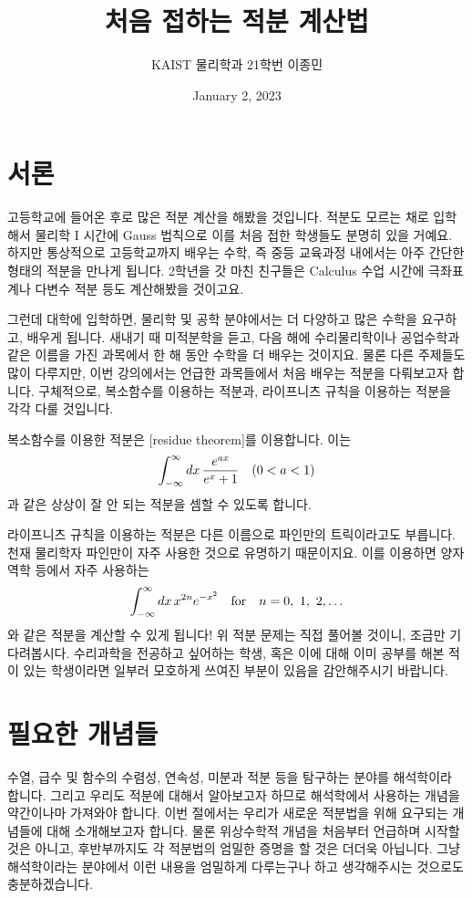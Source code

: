 \documentclass[11pt]{book}
\title{처음 접하는 적분 계산법}
\author{KAIST 물리학과 21학번 이종민}
\date{January 2, 2023}
\begin{document}
\section*{서론}
\begin{MLPar}
고등학교에 들어온 후로 많은 적분 계산을 해봤을 것입니다.
적분도 모르는 채로 입학해서 물리학 I 시간에 Gauss 법칙으로 이를 처음 접한 학생들도 분명히 있을 거예요.
하지만 통상적으로 고등학교까지 배우는 수학, 즉 중등 교육과정 내에서는 아주 간단한 형태의 적분을 만나게 됩니다.
2학년을 갓 마친 친구들은 Calculus 수업 시간에 극좌표계나 다변수 적분 등도 계산해봤을 것이고요.

그런데 대학에 입학하면, 물리학 및 공학 분야에서는 더 다양하고 많은 수학을 요구하고, 배우게 됩니다.
새내기 때 미적분학을 듣고, 다음 해에 수리물리학이나 공업수학과 같은 이름을 가진 과목에서 한 해 동안 수학을 더 배우는 것이지요.
물론 다른 주제들도 많이 다루지만, 이번 강의에서는 언급한 과목들에서 처음 배우는 적분을 다뤄보고자 합니다.
구체적으로, 복소함수를 이용하는 적분과, 라이프니츠 규칙을 이용하는 적분을 각각 다룰 것입니다.

복소함수를 이용한 적분은 [residue theorem]를 이용합니다.
이는
\[\int_{-\infty}^{\infty}\dd{x} \frac{e^{ax}}{e^x + 1} \quad(0 < a < 1)\]
과 같은 상상이 잘 안 되는 적분을 셈할 수 있도록 합니다.

라이프니츠 규칙을 이용하는 적분은 다른 이름으로 파인만의 트릭이라고도 부릅니다.
천재 물리학자 파인만이 자주 사용한 것으로 유명하기 때문이지요.
이를 이용하면 양자역학 등에서 자주 사용하는
\[\int_{-\infty}^{\infty}\dd{x} x^{2n} e^{-x^2} \quad\text{for}\quad n=0,\ 1,\ 2, \ldots\]
와 같은 적분을 계산할 수 있게 됩니다!
위 적분 문제는 직접 풀어볼 것이니, 조금만 기다려봅시다.
수리과학을 전공하고 싶어하는 학생, 혹은 이에 대해 이미 공부를 해본 적이 있는 학생이라면 일부러 모호하게 쓰여진 부분이 있음을 감안해주시기 바랍니다.
\end{MLPar}



\section{필요한 개념들}
\begin{MLPar}
수열, 급수 및 함수의 수렴성, 연속성, 미분과 적분 등을 탐구하는 분야를 해석학이라 합니다.
그리고 우리도 적분에 대해서 알아보고자 하므로 해석학에서 사용하는 개념을 약간이나마 가져와야 합니다.
이번 절에서는 우리가 새로운 적분법을 위해 요구되는 개념들에 대해 소개해보고자 합니다.
물론 위상수학적 개념을 처음부터 언급하며 시작할 것은 아니고, 후반부까지도 각 적분법의 엄밀한 증명을 할 것은 더더욱 아닙니다.
그냥 해석학이라는 분야에서 이런 내용을 엄밀하게 다루는구나 하고 생각해주시는 것으로도 충분하겠습니다.
\end{MLPar}
\end{document}
